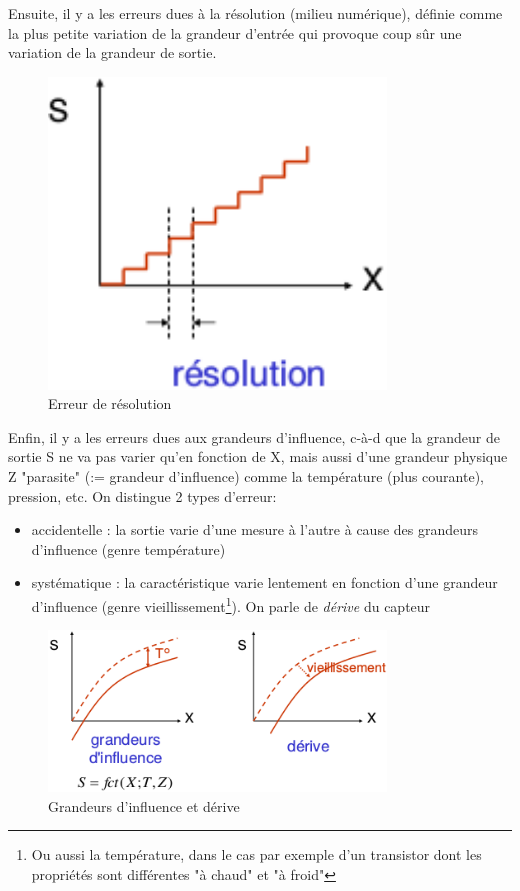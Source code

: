 Ensuite, il y a les erreurs dues à la résolution (milieu numérique), définie comme la plus petite variation de la grandeur d'entrée qui provoque coup sûr une variation de la grandeur de sortie.
\begin{figure}[H] 
	\centering 
	\includegraphics[width=0.8\textwidth,height=10\baselineskip,keepaspectratio]{ch2/image7}
	\caption{Erreur de résolution}
\end{figure}
Enfin, il y a les erreurs dues aux grandeurs d'influence, c-à-d que la grandeur de sortie S ne va pas varier qu'en fonction de X, mais aussi d'une grandeur physique Z "parasite" (:= grandeur d'influence) comme la température (plus courante), pression, etc. On distingue 2 types d'erreur:
\begin{itemize}
	\item accidentelle : la sortie varie d'une mesure à l'autre à cause des grandeurs d'influence (genre température)
	\item systématique : la caractéristique varie lentement en fonction d'une grandeur d'influence (genre vieillissement\footnote{Ou aussi la température, dans le cas par exemple d'un transistor dont les propriétés sont différentes "à chaud" et "à froid"}). On parle de \emph{dérive} du capteur
\end{itemize}
\begin{figure}[H] 
	\centering 
	\includegraphics[width=0.8\textwidth,height=10\baselineskip,keepaspectratio]{ch2/image8}
	\caption{Grandeurs d'influence et dérive}
\end{figure}
